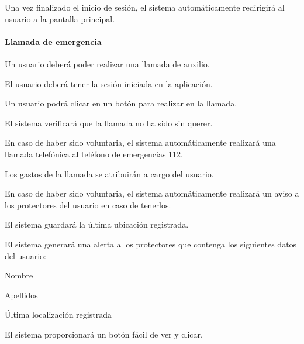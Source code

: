 \begin{myEnumerate}
\begin{myEnumerate}
      \item Una vez finalizado el inicio de sesión, el sistema automáticamente redirigirá al usuario a la pantalla principal.
    \end{myEnumerate}
\end{myEnumerate}

\paragraph*{Llamada de emergencia}

\begin{myEnumerate}[resume*]
  \item Un usuario deberá poder realizar una llamada de auxilio.
  \begin{myEnumerate}
    \item El usuario deberá tener la sesión iniciada en la aplicación.
  	\item Un usuario podrá clicar en un botón para realizar en la llamada.
  	\begin{myEnumerate}
  		\item El sistema verificará que la llamada no ha sido sin querer.
  		\begin{myEnumerate}
  			\item En caso de haber sido voluntaria, el sistema automáticamente realizará una llamada telefónica al teléfono de emergencias 112.
  				\begin{myEnumerate}
  					\item Los gastos de la llamada se atribuirán a cargo del usuario.
				\end{myEnumerate}
  			\item En caso de haber sido voluntaria, el sistema automáticamente realizará un aviso a los protectores del usuario en caso de tenerlos.
  				\begin{myEnumerate}
  					\item El sistema guardará la última ubicación registrada.
  					\item El sistema generará una alerta a los protectores que contenga los siguientes datos del usuario:
					 \begin{myEnumerate}
  						\item Nombre
  						\item Apellidos
  						\item Última localización registrada
  					 \end{myEnumerate}
			    \end{myEnumerate}
  		\end{myEnumerate}
  	\end{myEnumerate}
  	\item El sistema proporcionará un botón fácil de ver y clicar.
  \end{myEnumerate}
\end{myEnumerate}

